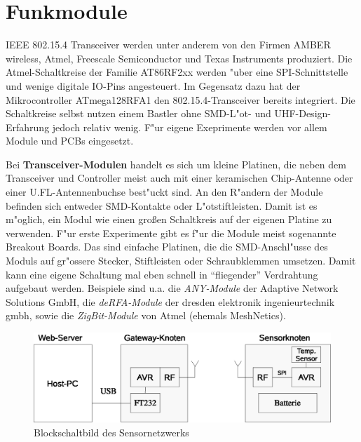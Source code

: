 \documentclass{clt2011}
\begin{document}

\section{Funkmodule}

IEEE 802.15.4 Transceiver werden unter anderem von den Firmen \textsf{AMBER wireless}, \textsf{Atmel},
\textsf{Freescale Semiconductor} und \textsf{Texas Instruments} produziert.
Die \textsf{Atmel}-Schaltkreise der Familie AT86RF2xx werden "uber eine
SPI-Schnittstelle und wenige digitale IO-Pins angesteuert.
Im Gegensatz dazu hat der Mikrocontroller ATmega128RFA1 den 802.15.4-Transceiver bereits integriert.
Die Schaltkreise selbst nutzen einem Bastler ohne SMD-L"ot- und UHF-Design-Erfahrung jedoch relativ
wenig. F"ur eigene Exeprimente werden vor allem Module und PCBs eingesetzt.

Bei {\bf Transceiver-Modulen} handelt es sich um kleine Platinen, die neben dem Transceiver und Controller
meist auch mit einer keramischen Chip-Antenne oder einer U.FL-Antennenbuchse best"uckt sind.
An den R"andern der Module befinden sich entweder SMD-Kontakte oder L"otstiftleisten. Damit ist
es m"oglich, ein Modul wie einen gro\ss{}en Schaltkreis auf der eigenen Platine zu verwenden.
F"ur erste Experimente gibt es f"ur die Module meist sogenannte Break\-out Boards.
Das sind einfache Platinen, die die SMD-Anschl"usse des Moduls auf gr"ossere
Stecker, Stiftleisten oder Schraubklemmen umsetzen.
Damit kann eine eigene Schaltung
mal eben schnell in "`fliegender"' Verdrahtung aufgebaut werden. Beispiele sind u.a.
die {\em ANY-Module} der \textsf{Adaptive Network Solutions GmbH},
die {\em deRFA-Module} der \textsf{dresden elektronik ingenieurtechnik gmbh},
sowie die {\em ZigBit-Module} von \textsf{Atmel} (ehemals \textsf{MeshNetics}).

\begin{figure}
\centering %
\includegraphics[width=.85\linewidth]{block1}
\caption{Blockschaltbild des Sensornetzwerks}
\label{fig:block1}
\end{figure}
\end{document}
